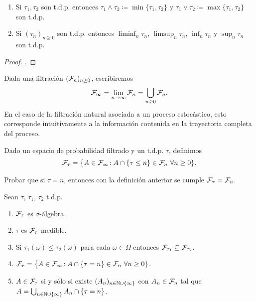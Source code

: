 \begin{prop}%
\leavevmode
\begin{enumerate}[label=\uptext{(\arabic*)}]
\item Si $\tau_1,\tau_2$ son t.d.p. entonces $\tau_1\wedge\tau_2\coloneqq\min\{\tau_1,\tau_2\}$ y $\tau_1\vee\tau_2\coloneqq\max\{\tau_1,\tau_2\}$ son t.d.p.
\item Si $(\tau_n)_{n\geq0}$ son t.d.p. entonces $\liminf_n\tau_n$, $\limsup_n\tau_n$, $\inf_n\tau_n$ y $\sup_n\tau_n$ son t.d.p.
\end{enumerate}
\end{prop}

\begin{proof}
\uexer.
\end{proof}

Dada una filtración $(\mathcal{F}_n)_{n\geq0}$, escribiremos
\[\mathcal{F}_\infty=\lim_{n\to\infty}\mathcal{F}_n=\bigcup_{n\geq0}\mathcal{F}_n.\]
En el caso de la filtración natural asociada a un proceso estocástico, esto corresponde intuitivamente a la información contenida en la trayectoria completa del proceso.

\begin{defn}
Dado un espacio de probabilidad filtrado y un t.d.p. $\tau$, definimos
\[\mathcal{F}_\tau=\big\{A\in\mathcal{F}_\infty\!:A\cap\{\tau\leq n\}\in\mathcal{F}_n~\forall n\geq0\}.\]
\end{defn}

\begin{ex}
Probar que si $\tau=n$, entonces con la definición anterior se cumple $\mathcal{F}_\tau=\mathcal{F}_n$.
\end{ex}

\begin{prop}
Sean $\tau$, $\tau_1$, $\tau_2$ t.d.p.
\begin{enumerate}[label=\uptext{(\arabic*)}]
\item $\mathcal{F}_\tau$ es $\sigma$-álgebra.
\item $\tau$ es $\mathcal{F}_\tau$-medible.
\item Si $\tau_1(\omega)\leq\tau_2(\omega)$ para cada $\omega\in\Omega$ entonces $\mathcal{F}_{\tau_1}\subseteq\mathcal{F}_{\tau_2}$.
\item $\mathcal{F}_\tau=\big\{A\in\mathcal{F}_\infty\!:A\cap\{\tau= n\}\in\mathcal{F}_n~\forall n\geq0\}$.
\item $A\in\mathcal{F}_\tau$ si y sólo si existe $(A_n)_{n\in\mathbb{N}\cup\{\infty\}}$ con $A_n\in\mathcal{F}_n$ tal que $A=\bigcup_{n\in\mathbb{N}\cup\{\infty\}}A_n\cap\{\tau=n\}$.
\end{enumerate}
\end{prop}

